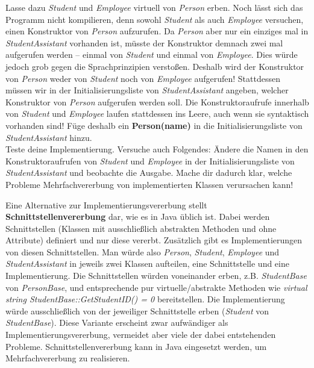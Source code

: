 \documentclass[
  accentcolor=tud1c,	%
  colorbacktitle,		%
  inverttitle,			%
  german,				%
  twoside
]{tudexercise}
\begin{document}
\begin{enumerate}
Lasse dazu \emph{Student} und \emph{Employee} virtuell von \emph{Person} erben.
Noch lässt sich das Programm nicht kompilieren, denn sowohl \emph{Student} als auch \emph{Employee} versuchen, einen Konstruktor von \emph{Person} aufzurufen.
Da \emph{Person} aber nur ein einziges mal in \emph{StudentAssistant} vorhanden ist, müsste der Konstruktor demnach zwei mal aufgerufen werden -- einmal von \emph{Student} und einmal von \emph{Employee}.
Dies würde jedoch grob gegen die Sprachprinzipien verstoßen.
Deshalb wird der Konstruktor von \emph{Person} weder von \emph{Student} noch von \emph{Employee} aufgerufen!
Stattdessen müssen wir in der Initialisierungsliste von \emph{StudentAssistant} angeben, welcher Konstruktor von \emph{Person} aufgerufen werden soll.
Die Konstruktoraufrufe innerhalb von \emph{Student} und \emph{Employee} laufen stattdessen ins Leere, auch wenn sie syntaktisch vorhanden sind! Füge deshalb ein \textbf{Person(name)} in die Initialisierungsliste von \emph{StudentAssistant} hinzu.\\

Teste deine Implementierung.
Versuche auch Folgendes: Ändere die Namen in den Konstruktoraufrufen von \emph{Student} und \emph{Employee} in der Initialisierungsliste von \emph{StudentAssistant} und beobachte die Ausgabe. 
Mache dir dadurch klar, welche Probleme Mehrfachvererbung von implementierten Klassen verursachen kann!\\

\end{enumerate}

Eine Alternative zur Implementierungsvererbung stellt \textbf{Schnittstellenvererbung} dar, wie es in Java üblich ist. Dabei werden Schnittstellen (Klassen mit ausschließlich abstrakten Methoden und ohne Attribute) definiert und nur diese vererbt.
Zusätzlich gibt es Implementierungen von diesen Schnittstellen.
Man würde also \emph{Person}, \emph{Student}, \emph{Employee} und \emph{StudentAssistant} in jeweils zwei Klassen aufteilen, eine Schnittstelle und eine Implementierung.
Die Schnittstellen würden voneinander erben, z.B. \emph{StudentBase} von \emph{PersonBase}, und entsprechende pur virtuelle/abstrakte Methoden wie \emph{virtual string StudentBase::GetStudentID() = 0} bereitstellen.
Die Implementierung würde ausschließlich von der jeweiliger Schnittstelle erben (\emph{Student} von \emph{StudentBase}).
Diese Variante erscheint zwar aufwändiger als Implementierungsvererbung, vermeidet aber viele der dabei entstehenden Probleme. 
Schnittstellenvererbung kann in Java eingesetzt werden, um Mehrfachvererbung zu realisieren.
\end{document}
